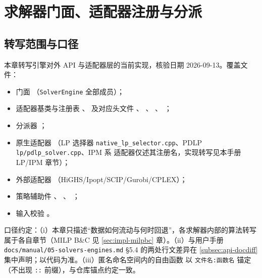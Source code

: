 
\section{求解器门面、适配器注册与分派}\label{sec:impl-api-adapters}

\subsection{转写范围与口径}\label{subsec:api-scope}

本章转写引擎对外 API 与适配器层的当前实现，核验日期 2026-09-13。覆盖文件：
\begin{itemize}
  \item 门面 （\texttt{SolverEngine} 全部成员）；
  \item 适配器基类与注册表
        、
         及对应头文件
        、
        、
        、
        ；
  \item 分派器 ；
  \item 原生适配器
        （LP 选择器
        \texttt{native\_lp\_selector.cpp}、PDLP \texttt{lp/pdlp\_solver.cpp}、IPM 系
        适配器仅述其注册名，实现转写见本手册 LP/IPM 章节）；
  \item 外部适配器 
        （HiGHS/Ipopt/SCIP/Gurobi/CPLEX）；
  \item 策略辅助件 、
        、
        ；
  \item 输入校验 。
\end{itemize}

\begin{boundarynote}
口径约定：（i）本章只描述``数据如何流动与何时回退''，各求解器内部的算法转写
属于各自章节（MILP B\&C 见 \ref{sec:impl-milpbc} 章）。（ii）与用户手册
\texttt{docs/manual/05-solvers-engines.md} \S 5.4 的两处行文差异在
\ref{subsec:api-docdiff} 集中声明；以代码为准。（iii）匿名命名空间内的自由函数
以 \texttt{文件名:函数名} 锚定（不出现 \texttt{::} 前缀），与仓库锚点约定一致。
\end{boundarynote}

